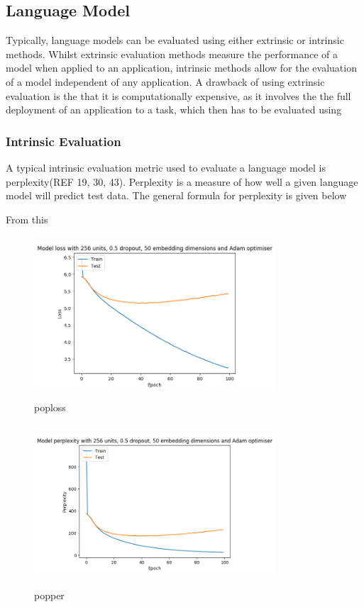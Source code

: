\subsection{Language Model}
Typically, language models can be evaluated using either extrinsic or intrinsic methods. Whilst extrinsic evaluation methods measure the performance of a model when applied to an application, intrinsic methods allow for the evaluation of a model independent of any application. A drawback of using extrinsic evaluation is the that it is computationally expensive, as it involves the the full deployment of an application to a task, which then has to be evaluated using 
\subsubsection{Intrinsic Evaluation}
A typical intrinsic evaluation metric used to evaluate a language model is perplexity(REF 19, 30, 43). Perplexity is a measure of how well a given language model will predict test data. The general formula for perplexity is given below

\noindent
\newline
From this 

\begin{figure}[h]
	\includegraphics[width=9cm, height=6cm]{./figures/poploss}
	\centering
	\caption{poploss}
	\label{fig:poploss}
\end{figure}

\begin{figure}[h]
	\includegraphics[width=9cm, height=6cm]{./figures/popper}
	\centering
	\caption{popper}
	\label{fig:popper}
\end{figure}

